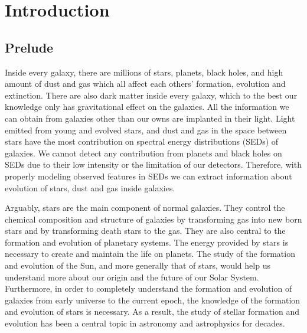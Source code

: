 \chapter{Introduction}
\label{chap:intro}

\section{Prelude}
\label{sec: overview}
Inside every galaxy, there are millions of stars, planets, black holes, and high amount of dust and gas which all affect each others' formation, evolution and extinction.
There are also dark matter inside every galaxy, which to the best our knowledge only has gravitational effect on the galaxies.
All the information we can obtain from galaxies other than our owns are implanted in their light. %
Light emitted from young and evolved stars, and dust and gas in the space between stars have the most contribution on spectral energy distributions (SEDs) of galaxies.
We cannot detect any contribution from planets and black holes on SEDs due to their low intensity or the limitation of our detectors.
Therefore, with properly modeling observed features in SEDs we can extract information about evolution of stars, dust and gas inside galaxies.

Arguably, stars are the main component of normal galaxies.
They control the chemical composition and structure of galaxies by transforming gas into new born stars and by transforming death stars to the gas.
They are also central to the formation and evolution of planetary systems.
The energy provided by stars is necessary to create and maintain the life on planets. 
The study of the formation and evolution of the Sun, and more generally that of stars, would help us understand more about our origin and the future of our Solar System.
Furthermore, in order to completely understand the formation and evolution of galaxies from early universe to the current epoch, the knowledge of the formation and evolution of stars is necessary. 
As a result, the study of stellar formation and evolution has been a central topic in astronomy and astrophysics for decades.

